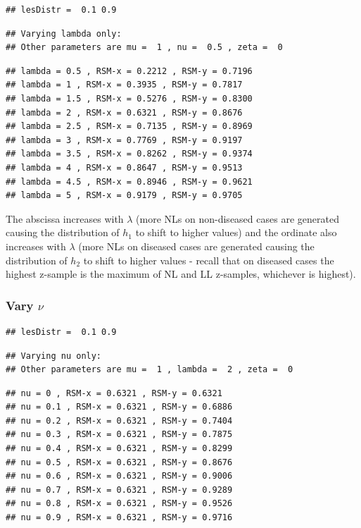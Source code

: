 \documentclass[
]{book}
\begin{document}
\begin{verbatim}
## lesDistr =  0.1 0.9
\end{verbatim}

\begin{verbatim}
## Varying lambda only: 
## Other parameters are mu =  1 , nu =  0.5 , zeta =  0
\end{verbatim}

\begin{verbatim}
## lambda = 0.5 , RSM-x = 0.2212 , RSM-y = 0.7196 
## lambda = 1 , RSM-x = 0.3935 , RSM-y = 0.7817 
## lambda = 1.5 , RSM-x = 0.5276 , RSM-y = 0.8300 
## lambda = 2 , RSM-x = 0.6321 , RSM-y = 0.8676 
## lambda = 2.5 , RSM-x = 0.7135 , RSM-y = 0.8969 
## lambda = 3 , RSM-x = 0.7769 , RSM-y = 0.9197 
## lambda = 3.5 , RSM-x = 0.8262 , RSM-y = 0.9374 
## lambda = 4 , RSM-x = 0.8647 , RSM-y = 0.9513 
## lambda = 4.5 , RSM-x = 0.8946 , RSM-y = 0.9621 
## lambda = 5 , RSM-x = 0.9179 , RSM-y = 0.9705
\end{verbatim}

The abscissa increases with \(\lambda\) (more NLs on non-diseased cases are generated causing the distribution of \(h_1\) to shift to higher values) and the ordinate also increases with \(\lambda\) (more NLs on diseased cases are generated causing the distribution of \(h_2\) to shift to higher values - recall that on diseased cases the highest z-sample is the maximum of NL and LL z-samples, whichever is highest).

\hypertarget{vary-nu}{%
\subsubsection{\texorpdfstring{Vary \(\nu\)}{Vary \textbackslash nu}}\label{vary-nu}}

\begin{verbatim}
## lesDistr =  0.1 0.9
\end{verbatim}

\begin{verbatim}
## Varying nu only: 
## Other parameters are mu =  1 , lambda =  2 , zeta =  0
\end{verbatim}

\begin{verbatim}
## nu = 0 , RSM-x = 0.6321 , RSM-y = 0.6321 
## nu = 0.1 , RSM-x = 0.6321 , RSM-y = 0.6886 
## nu = 0.2 , RSM-x = 0.6321 , RSM-y = 0.7404 
## nu = 0.3 , RSM-x = 0.6321 , RSM-y = 0.7875 
## nu = 0.4 , RSM-x = 0.6321 , RSM-y = 0.8299 
## nu = 0.5 , RSM-x = 0.6321 , RSM-y = 0.8676 
## nu = 0.6 , RSM-x = 0.6321 , RSM-y = 0.9006 
## nu = 0.7 , RSM-x = 0.6321 , RSM-y = 0.9289 
## nu = 0.8 , RSM-x = 0.6321 , RSM-y = 0.9526 
## nu = 0.9 , RSM-x = 0.6321 , RSM-y = 0.9716
\end{verbatim}
\end{document}
